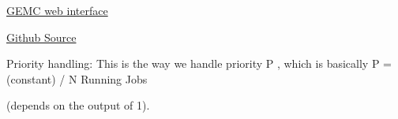 

\href{https://gemc.jlab.org/web_interface/index.php}{GEMC web interface}

\href{https://github.com/mit-mc-clas12}{Github Source}

Priority handling:  This is the way we handle priority P , which is basically P =  (constant) / N Running Jobs

   (depends on the output of 1).
